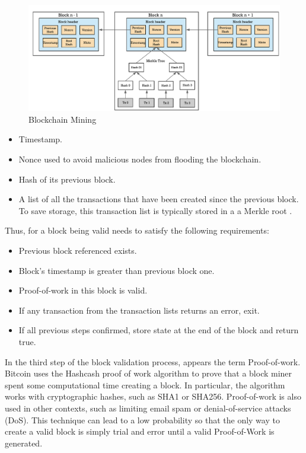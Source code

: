 \begin{figure}[t]
  	\includegraphics[width=1\linewidth]{gfx/mining}    
  	\caption{Blockchain Mining}
  	\label{fig:Blockchain mining}
\end{figure}

\begin{itemize}
	
	\item Timestamp.
	\item Nonce used to avoid malicious nodes from flooding the blockchain.
	\item Hash of its previous block. 
	\item A list of all the transactions that have been created since the previous block. To save storage, this transaction list is typically stored in a a Merkle root \citep{merkle1987digital}.
\end{itemize}

Thus, for a block being valid needs to satisfy the following requirements:

\begin{itemize}
	
	\item Previous block referenced exists.
	\item Block's timestamp is greater than previous block one.
	\item Proof-of-work in this block is valid.
	\item If any transaction from the transaction lists returns an error, exit.
	\item If all previous steps confirmed, store state at the end of the block and return true.
\end{itemize}  

In the third step of the block validation process, appears the term Proof-of-work. Bitcoin uses the Hashcash proof of work algorithm to prove that a block miner spent some computational time creating a block. In particular, the algorithm works with cryptographic hashes, such as SHA1 or SHA256. Proof-of-work is also used in other contexts, such as limiting email spam or denial-of-service attacks (DoS). This technique can lead to a low probability so that the only way to create a valid block is simply trial and error until a valid Proof-of-Work is generated.


